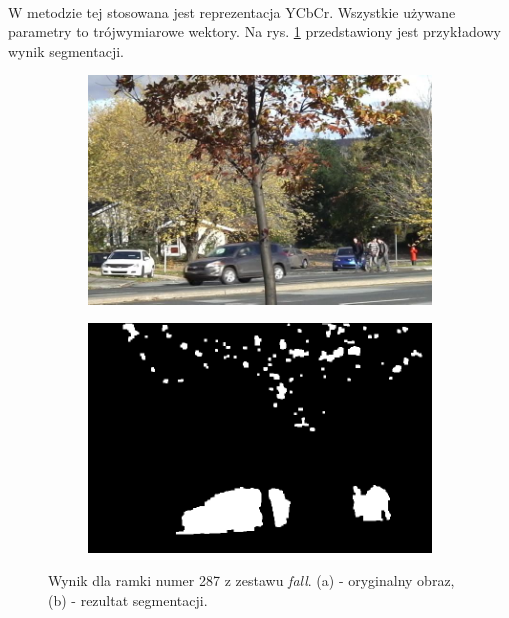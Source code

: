\paragraph{}
W metodzie tej stosowana jest reprezentacja YCbCr. Wszystkie używane parametry to trójwymiarowe wektory. Na rys. \ref{fig:binWang} przedstawiony jest przykładowy wynik segmentacji.

\begin{figure}[!h]
\centering
\begin{subfigure}[b]{0.4\textwidth}
\includegraphics[width=\textwidth]{img/binWangIn}
\caption{}
\end{subfigure}
\quad
\begin{subfigure}[b]{0.4\textwidth}
\includegraphics[width=\textwidth]{img/binWangOut}
\caption{}
\end{subfigure}
\caption{Wynik dla ramki numer 287 z zestawu \textit{fall}. (a) - oryginalny obraz, (b) - rezultat segmentacji.\label{fig:binWang}}
\end{figure}